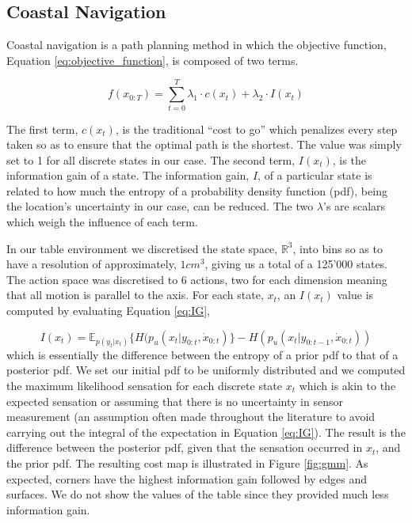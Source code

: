 \subsection{Coastal Navigation}\label{chap3:costal_policy}

Coastal navigation \cite{CostalNavigation1999} is a path planning method in which the objective function, 
Equation \ref{eq:objective_function}, is composed of two terms.

\begin{equation}\label{eq:objective_function}
 f(x_{0:T}) = \sum\limits_{t=0}^{T} \lambda_1 \cdot c(x_t) + \lambda_2 \cdot I(x_t)
\end{equation}

The first term, $c(x_t)$, is the traditional ``cost to go'' which penalizes every step taken so as to ensure that the
optimal path is the shortest. The value was simply set to 1 for all discrete states in our case. The second term, $I(x_t)$, 
is the information gain of a state. The information gain, $I$, of a particular state is related to how much 
the entropy of a probability density function (pdf), being the location's uncertainty in our case, can be reduced. The two $\lambda$'s are scalars which weigh the influence 
of each term.

In our table environment we discretised the state space, $\mathbb{R}^3$, into bins so as to have a resolution of approximately, $1 cm^3$, giving us a total of a 125'000
states. The action space was discretised to 6 actions, two for each dimension meaning that all motion is parallel to the axis. For each state, $x_t$, an $I(x_t)$ value is
computed by evaluating Equation \ref{eq:IG},


\begin{equation}\label{eq:IG}
 I(x_t) = \mathbb{E}_{p(y_t|x_t)}\{ H(p_u(x_t|y_{0:t},\dot{x}_{0:t}) \} - H(p_u(x_t|y_{0:t-1},\dot{x}_{0:t}))
\end{equation}
which is essentially the difference between the entropy of a prior pdf to that of a posterior pdf.
We set our initial pdf to be uniformly distributed and  we computed the maximum likelihood sensation for each discrete state $x_t$
which is akin to the expected sensation or assuming that there is no uncertainty in sensor measurement (an assumption 
often made throughout the literature to avoid carrying out the integral of the expectation in Equation \ref{eq:IG}).
The result is the difference between the posterior pdf, given that the sensation occurred in $x_t$, and the prior pdf. The resulting cost
map is illustrated in Figure \ref{fig:gmm}. As expected, corners have the highest information gain followed by edges and surfaces. 
We do not show the values of the table since they provided much less information gain.

